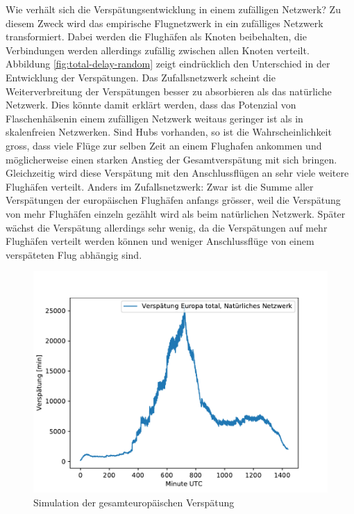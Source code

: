 Wie verhält sich die Verspätungsentwicklung in einem zufälligen Netzwerk?
Zu diesem Zweck wird das empirische Flugnetzwerk in ein zufälliges Netzwerk transformiert.
Dabei werden die Flughäfen als Knoten beibehalten, die Verbindungen werden allerdings zufällig zwischen allen
Knoten verteilt.
Abbildung \ref{fig:total-delay-random} zeigt eindrücklich den Unterschied in der Entwicklung der Verspätungen.
Das Zufallsnetzwerk scheint die Weiterverbreitung der Verspätungen besser zu absorbieren als das natürliche Netzwerk.
Dies könnte damit erklärt werden, dass das Potenzial von \guillemotleft Flaschenhälsen\guillemotright in einem
zufälligen Netzwerk weitaus geringer ist als in skalenfreien Netzwerken.
Sind Hubs vorhanden, so ist die Wahrscheinlichkeit gross, dass viele Flüge zur selben Zeit an einem Flughafen ankommen
und möglicherweise einen starken Anstieg der Gesamtverspätung mit sich bringen.
Gleichzeitig wird diese Verspätung mit den Anschlussflügen an sehr viele weitere Flughäfen verteilt.
Anders im Zufallsnetzwerk: Zwar ist die Summe aller Verspätungen der europäischen Flughäfen anfangs grösser, weil
die Verspätung von mehr Flughäfen einzeln gezählt wird als beim natürlichen Netzwerk.
Später wächst die Verspätung allerdings sehr wenig, da die Verspätungen auf mehr Flughäfen verteilt werden können und
weniger Anschlussflüge von einem verspäteten Flug abhängig sind.

\begin{figure}
    \centering
    \includegraphics[width=0.75\linewidth]{images/total-delay-first-simulation-run.pdf}
    \caption{Simulation der gesamteuropäischen Verspätung}
    \label{fig:first-simulation-run}
\end{figure}

